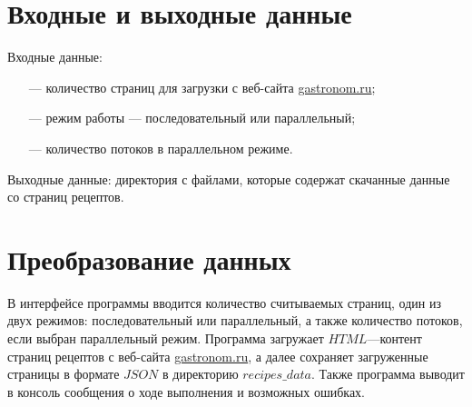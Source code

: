 \chapter{Входные и выходные данные}

Входные данные: 
\begin{itemize}
    \item[---] количество страниц для загрузки с веб-сайта \url{gastronom.ru};
    \item[---] режим работы --- последовательный или параллельный;
    \item[---] количество потоков в параллельном режиме.
\end{itemize}

Выходные данные: директория с файлами, которые содержат скачанные данные со страниц рецептов.

\clearpage

\chapter{Преобразование данных}

В интерфейсе программы вводится количество считываемых страниц, один из двух режимов: последовательный или параллельный, а также количество потоков, если выбран параллельный режим. Программа загружает $HTML$---контент страниц рецептов с веб-сайта \url{gastronom.ru}, а далее сохраняет загруженные страницы в формате $JSON$ в директорию $recipes\_data$. Также программа выводит в консоль сообщения о ходе выполнения и возможных ошибках.

\clearpage